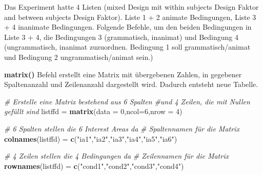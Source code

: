 \documentclass[]{book}
\newenvironment{Shaded}{\begin{snugshade}}{\end{snugshade}}
\newcommand{\KeywordTok}[1]{\textcolor[rgb]{0.13,0.29,0.53}{\textbf{#1}}}
\newcommand{\DataTypeTok}[1]{\textcolor[rgb]{0.13,0.29,0.53}{#1}}
\newcommand{\DecValTok}[1]{\textcolor[rgb]{0.00,0.00,0.81}{#1}}
\newcommand{\StringTok}[1]{\textcolor[rgb]{0.31,0.60,0.02}{#1}}
\newcommand{\CommentTok}[1]{\textcolor[rgb]{0.56,0.35,0.01}{\textit{#1}}}
\newcommand{\OperatorTok}[1]{\textcolor[rgb]{0.81,0.36,0.00}{\textbf{#1}}}
\newcommand{\NormalTok}[1]{#1}
\begin{document}
Das Experiment hatte 4 Listen (mixed Design mit within subjects Design
Faktor and between subjects Design Faktor). Liste 1 + 2 animate
Bedingungen, Liste 3 + 4 inanimate Bedingungen. Folgende Befehle, um den
beiden Bedingungen in Liste 3 + 4, die Bedingungen 3 (grammatisch,
inanimat) und Bedingung 4 (ungrammatisch, inanimat zuzuordnen. Bedingung
1 soll grammatisch/animat und Bedingung 2 ungrammatisch/animat sein.)

\begin{Shaded}
\end{Shaded}

\textbf{matrix()} Befehl erstellt eine Matrix mit übergebenen Zahlen, in
gegebener Spaltenanzahl und Zeilenanzahl dargestellt wird. Dadurch
entsteht neue Tabelle.

\begin{Shaded}
\begin{Highlighting}[]
\CommentTok{# Erstelle eine Matrix bestehend aus 6 Spalten }
\CommentTok{#und 4 Zeilen, die mit Nullen gefüllt sind}
\NormalTok{listffd =}\StringTok{ }\KeywordTok{matrix}\NormalTok{(}\DataTypeTok{data =} \DecValTok{0}\NormalTok{,}\DataTypeTok{ncol=}\DecValTok{6}\NormalTok{,}\DataTypeTok{nrow =} \DecValTok{4}\NormalTok{)}

\CommentTok{# 6 Spalten stellen die 6 Interest Areas da}
\CommentTok{# Spaltennamen für die Matrix}
\KeywordTok{colnames}\NormalTok{(listffd) =}\StringTok{ }\KeywordTok{c}\NormalTok{(}\StringTok{"ia1"}\NormalTok{,}\StringTok{"ia2"}\NormalTok{,}\StringTok{"ia3"}\NormalTok{,}\StringTok{"ia4"}\NormalTok{,}\StringTok{"ia5"}\NormalTok{,}\StringTok{"ia6"}\NormalTok{)}

\CommentTok{# 4 Zeilen stellen die 4 Bedingungen da}
\CommentTok{# Zeilennamen für die Matrix}
\KeywordTok{rownames}\NormalTok{(listffd) =}\StringTok{ }\KeywordTok{c}\NormalTok{(}\StringTok{"cond1"}\NormalTok{,}\StringTok{"cond2"}\NormalTok{,}\StringTok{"cond3"}\NormalTok{,}\StringTok{"cond4"}\NormalTok{)}
\end{Highlighting}
\end{Shaded}
\end{document}

